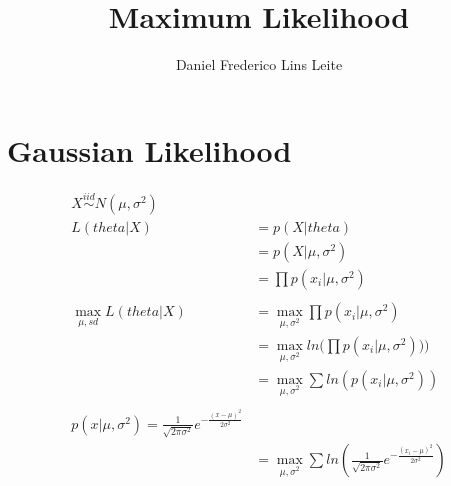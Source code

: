\documentclass[10pt,a4paper]{article}
\author{Daniel Frederico Lins Leite}
\title{Maximum Likelihood}
\begin{document}
	\maketitle
	
	\section{Gaussian Likelihood}
	\begin{align*}
		X \overset{iid}{\sim} N(\mu,\sigma^2)\\
		L(theta|X) &= p(X|theta)\\
		&= p(X|\mu,\sigma^2)\\
		&= \prod{p(x_i|\mu,\sigma^2)}\\
		\\
		\max_{\mu,sd}{L(theta|X)} &= \max_{\mu,\sigma^2}{\prod{p(x_i|\mu,\sigma^2)}}\\
		&= \max_{\mu,\sigma^2}{ln(\prod{p(x_i|\mu,\sigma^2)))}}\\
		&= \max_{\mu,\sigma^2}{\sum{ln(p(x_i|\mu,\sigma^2))}}\\
		\\
		p(x|\mu,\sigma^2) = \frac{1}{\sqrt{2\pi\sigma^2}} e^{-\frac{(x-\mu)^2}{2\sigma^2}}
		\\
		&= \max_{\mu,\sigma^2}{\sum{ln(\frac{1}{\sqrt{2\pi\sigma^2}} e^{-\frac{(x_i-\mu)^2}{2\sigma^2}})}}\\
	\end{align*}
\end{document}

